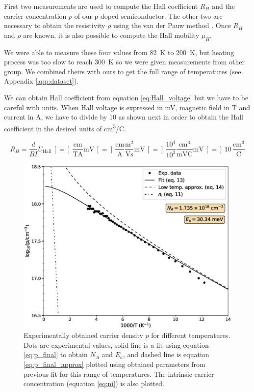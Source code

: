 \documentclass[11pt,a4paper]{article}
\begin{document}
First two measurements are used to compute the Hall coefficient $R_H$ and the carrier concentration $p$ of our p-doped semiconductor. The other two are necessary to obtain the resistivity $\rho$ using the van der Pauw method \cite{vdP}. Once $R_H$ and $\rho$ are known, it is also possible to compute the Hall mobility $\mu_H$.

We were able to measure these four values from \SI{82}{\kelvin} to \SI{200}{\kelvin}, but heating process was too slow to reach \SI{300}{\kelvin} so we were given measurements from other group. We combined theirs with ours to get the full range of temperatures (see Appendix \ref{app:dataset}).

We can obtain Hall coefficient from equation \eqref{eq:Hall_voltage} but we have to be careful with units. When Hall voltage is expressed in \si{\milli\volt}, magnetic field in \si{\tesla} and current in \si{\ampere}, we have to divide by 10 as shown next in order to obtain the Hall coefficient in the desired units of \si{\centi\meter^3/\coulomb}.

\begin{equation*}
R_H=\frac{d}{BI}U_\text{Hall}\,[=]\,\frac{\si{\centi\meter}}{\si{\tesla\ampere}}\si{\milli\volt}\,[=]\,\frac{\si{\centi\meter}}{\si{\ampere}}\frac{\si{\meter^2}}{\si{\volt\second}}\si{\milli\volt}\,[=]\,\frac{10^4}{10^3}\frac{\si{\centi\meter^3}}{\si{\milli\volt\coulomb}}\si{\milli\volt}\,[=]\,10\,\frac{\si{\centi\meter^3}}{\si{\coulomb}}
\end{equation*}

\begin{figure}[H]
\centering
\includegraphics[width=.7\textwidth]{carrier_density.eps}
\caption{Experimentally obtained carrier density $p$ for different temperatures. Dots are experimental values, solid line is a fit using equation \eqref{eq:p_final} to obtain $N_A$ and $E_a$, and dashed line is equation \eqref{eq:p_final_approx} plotted using obtained parameters from previous fit for this range of temperatures. The intrinsic carrier concentration (equation \eqref{eq:ni}) is also plotted.}
\label{fig:carrier_density}
\end{figure}
\end{document}
